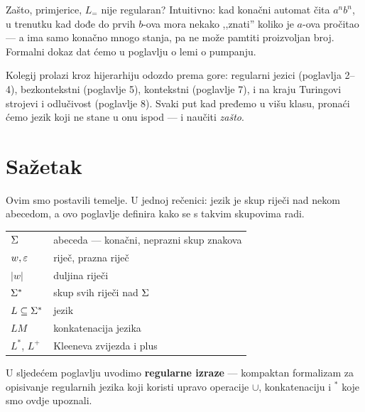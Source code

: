 Zašto, primjerice, $L_=$ nije regularan? Intuitivno: kad konačni automat
čita $a^n b^n$, u trenutku kad dođe do prvih $b$-ova mora nekako ,,znati''
koliko je $a$-ova pročitao --- a ima samo konačno mnogo stanja, pa ne može
pamtiti proizvoljan broj. Formalni dokaz dat ćemo u poglavlju o lemi o
pumpanju.

\begin{kljucno}
Kolegij prolazi kroz hijerarhiju odozdo prema gore: regularni jezici
(poglavlja 2--4), bezkontekstni (poglavlje 5), kontekstni (poglavlje 7),
i na kraju Turingovi strojevi i odlučivost (poglavlje 8).
Svaki put kad pređemo u višu klasu, pronaći ćemo jezik koji ne stane
u onu ispod --- i naučiti \emph{zašto}.
\end{kljucno}

\section*{Sažetak}

Ovim smo postavili temelje. U jednoj rečenici: jezik je skup riječi nad
nekom abecedom, a ovo poglavlje definira kako se s takvim skupovima radi.

\medskip
\noindent
\begin{tabular}{ll}
  $\Sigma$ & abeceda --- konačni, neprazni skup znakova \\
  $w, \varepsilon$ & riječ, prazna riječ \\
  $|w|$ & duljina riječi \\
  $\Sigma^*$ & skup svih riječi nad $\Sigma$ \\
  $L \subseteq \Sigma^*$ & jezik \\
  $LM$ & konkatenacija jezika \\
  $L^*$, $L^+$ & Kleeneva zvijezda i plus \\
\end{tabular}

\medskip
\noindent U sljedećem poglavlju uvodimo \textbf{regularne izraze} ---
kompaktan formalizam za opisivanje regularnih jezika koji koristi upravo
operacije $\cup$, konkatenaciju i ${}^*$ koje smo ovdje upoznali.
